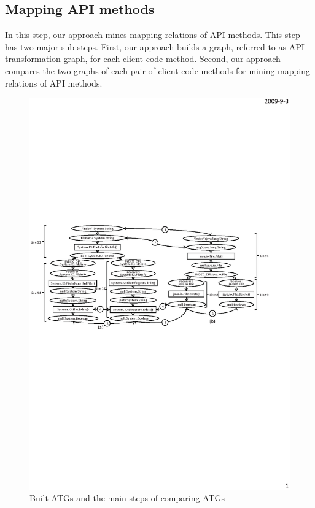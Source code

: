 
\subsection{Mapping API methods}
\label{sec:approach:mappingmethods}

In this step, our approach mines mapping relations of API methods.
This step has two major sub-steps. First, our approach builds a graph, referred
to as API transformation graph, for each client code
method. Second, our approach compares the two graphs of each pair of
client-code methods for mining mapping relations of API methods.

\begin{figure}[t]
\centering
\includegraphics[scale=1.1,clip]{figure/graph.eps}\vspace*{-3ex}
 \caption
{\label{fig:graph}Built ATGs and the main steps of comparing
ATGs}\vspace*{-3.5ex}
\end{figure}

